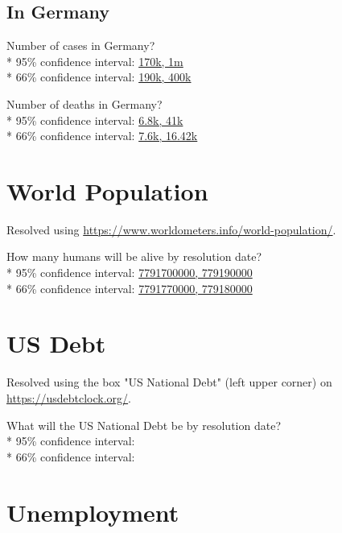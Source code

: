 \documentclass{article}
\begin{document}
\subsection*{In Germany}

Number of cases in Germany?\\*
95\% confidence interval: \null\hfill\underline{170k, 1m}\\*
66\% confidence interval: \null\hfill\underline{190k, 400k}

\vspace{0.3cm}

Number of deaths in Germany?\\*
95\% confidence interval: \null\hfill\underline{6.8k, 41k}\\*
66\% confidence interval: \null\hfill\underline{7.6k, 16.42k}

\section*{World Population}

Resolved using
\href{https://www.worldometers.info/world-population/}{https://www.worldometers.info/world-population/}.

\vspace{0.3cm}

How many humans will be alive by resolution date?\\*
95\% confidence interval: \null\hfill\underline{7791700000, 779190000}\\*
66\% confidence interval: \null\hfill\underline{7791770000, 779180000}

\section*{US Debt}

Resolved using the box "US National Debt" (left upper corner) on
\href{https://usdebtclock.org/}{https://usdebtclock.org/}.

\vspace{0.3cm}

What will the US National Debt be by resolution date?\\*
95\% confidence interval: \null\hfill\underline{\hspace{8cm}}\\*
66\% confidence interval: \null\hfill\underline{\hspace{8cm}}

\section*{Unemployment}
\end{document}
